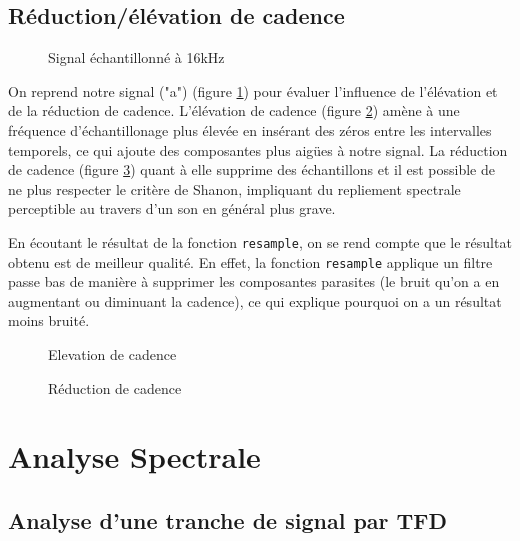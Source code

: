 \documentclass[french]{article}
\begin{document}
\FloatBarrier
\subsection{Réduction/élévation de cadence}

\begin{figure}[h!]
	\centering
	
	\caption{Signal échantillonné à 16kHz}
	\label{fig:cadence_signal}
\end{figure}

On reprend notre signal ("a") (figure \ref{fig:cadence_signal}) pour évaluer l'influence de l'élévation et de la réduction de cadence.
L'élévation de cadence (figure \ref{fig:élévation}) amène à une fréquence d'échantillonage plus élevée en insérant des zéros entre les intervalles temporels, ce qui ajoute des composantes plus aigües à notre signal. La réduction de cadence (figure \ref{fig:réduction}) quant à elle supprime des échantillons et il est possible de ne plus respecter le critère de Shanon, impliquant du repliement spectrale perceptible au travers d'un son en général plus grave.

En écoutant le résultat de la fonction \verb`resample`, on se rend compte que le résultat obtenu est de meilleur qualité. En effet, la fonction \verb`resample` applique un filtre passe bas de manière à supprimer les composantes parasites (le bruit qu'on a en augmentant ou diminuant la cadence), ce qui explique pourquoi on a un résultat moins bruité.

\begin{figure}[h!]
	\centering
	
	\caption{Elevation de cadence}
	\label{fig:élévation}
\end{figure}

\begin{figure}[h!]
	\centering
	
	\caption{Réduction de cadence}
	\label{fig:réduction}
\end{figure}

\FloatBarrier
\section{Analyse Spectrale}
\subsection{Analyse d'une tranche de signal par TFD}
\end{document}
